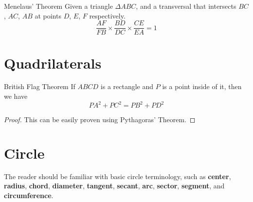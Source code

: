 \begin{thrm}{Menelaus' Theorem}{}
Given a triangle $\Delta ABC$, and a transversal that intersects $BC$, $AC$, $AB$ at points $D$, $E$, $F$ respectively. 
\begin{equation} \frac {AF}{FB} \times \frac {BD}{DC} \times \frac {CE}{EA} = 1 \end{equation} 
\end{thrm}

\begin{figure}[H]
    \centering
\end{figure}
\pagebreak

\section{Quadrilaterals}
\begin{thrm}{British Flag Theorem}{} 
If $ABCD$ is a rectangle and $P$ is a point inside of it, then we have 
\[ PA^2 + PC^2 = PB^2 + PD^2 \] 
\end{thrm}

\begin{figure}[H]
    \centering
\end{figure}

\begin{proof}
This can be easily proven using Pythagoras' Theorem.
\end{proof}
\pagebreak

\section{Circle}
The reader should be familiar with basic circle terminology, such as \textbf{center}, \textbf{radius}, \textbf{chord}, \textbf{diameter}, \textbf{tangent}, \textbf{secant}, \textbf{arc}, \textbf{sector}, \textbf{segment}, and \textbf{circumference}.

